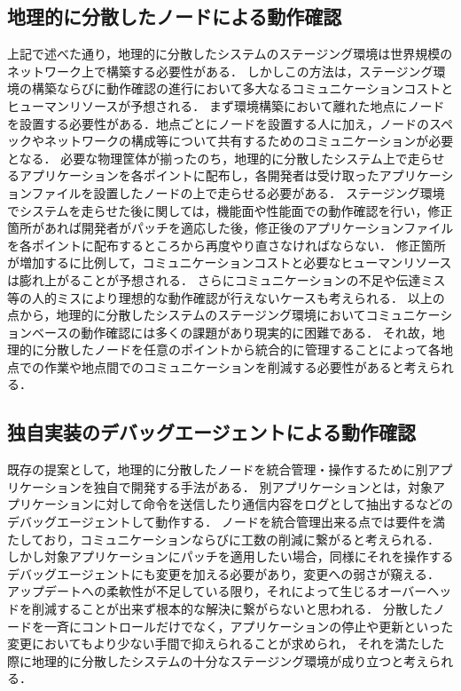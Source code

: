 \subsection{地理的に分散したノードによる動作確認}
上記で述べた通り，地理的に分散したシステムのステージング環境は世界規模のネットワーク上で構築する必要性がある．
しかしこの方法は，ステージング環境の構築ならびに動作確認の進行において多大なるコミュニケーションコストとヒューマンリソースが予想される．
まず環境構築において離れた地点にノードを設置する必要性がある．地点ごとにノードを設置する人に加え，ノードのスペックやネットワークの構成等について共有するためのコミュニケーションが必要となる．
必要な物理筐体が揃ったのち，地理的に分散したシステム上で走らせるアプリケーションを各ポイントに配布し，各開発者は受け取ったアプリケーションファイルを設置したノードの上で走らせる必要がある．
ステージング環境でシステムを走らせた後に関しては，機能面や性能面での動作確認を行い，修正箇所があれば開発者がパッチを適応した後，修正後のアプリケーションファイルを各ポイントに配布するところから再度やり直さなければならない．
修正箇所が増加するに比例して，コミュニケーションコストと必要なヒューマンリソースは膨れ上がることが予想される．
さらにコミュニケーションの不足や伝達ミス等の人的ミスにより理想的な動作確認が行えないケースも考えられる．
以上の点から，地理的に分散したシステムのステージング環境においてコミュニケーションベースの動作確認には多くの課題があり現実的に困難である．
それ故，地理的に分散したノードを任意のポイントから統合的に管理することによって各地点での作業や地点間でのコミュニケーションを削減する必要性があると考えられる．

\subsection{独自実装のデバッグエージェントによる動作確認}
既存の提案として，地理的に分散したノードを統合管理・操作するために別アプリケーションを独自で開発する手法がある．
別アプリケーションとは，対象アプリケーションに対して命令を送信したり通信内容をログとして抽出するなどのデバッグエージェントして動作する．
ノードを統合管理出来る点では要件を満たしており，コミュニケーションならびに工数の削減に繋がると考えられる．
しかし対象アプリケーションにパッチを適用したい場合，同様にそれを操作するデバッグエージェントにも変更を加える必要があり，変更への弱さが窺える．
アップデートへの柔軟性が不足している限り，それによって生じるオーバーヘッドを削減することが出来ず根本的な解決に繋がらないと思われる．
分散したノードを一斉にコントロールだけでなく，アプリケーションの停止や更新といった変更においてもより少ない手間で抑えられることが求められ，
それを満たした際に地理的に分散したシステムの十分なステージング環境が成り立つと考えられる．


